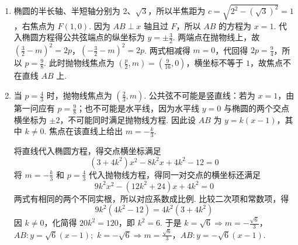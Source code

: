 \begin{solution}
\begin{enumerate}
\item 椭圆的半长轴、半短轴分别为 \(2\)、\(\sqrt3\)，所以半焦距为 \(c=\sqrt{2^2-(\sqrt3)^2}=1\)，右焦点为 \(F(1,0)\). 因为 \(AB\perp x\) 轴且过 \(F\)，所以 \(AB\) 的方程为 \(x=1\). 代入椭圆方程得公共弦端点的纵坐标为 \(y=\pm\frac32\). 两端点在抛物线上，故
\(\left(\frac32-m\right)^2=2p\)，\(\left(-\frac32-m\right)^2=2p\).
两式相减得 \(m=0\)，代回得 \(2p=\frac94\)，所以 \(p=\frac98\). 此时抛物线焦点为 \(\left(\frac{p}{2},m\right)=\left(\frac9{16},0\right)\)，横坐标不等于 \(1\)，故焦点不在直线 \(AB\) 上.
\item 当 \(p=\frac43\) 时，抛物线焦点为 \(\left(\frac23,m\right)\). 公共弦不可能是竖直线：若为 \(x=1\)，由第一问应有 \(p=\frac98\)；也不可能是水平线，因为水平线 \(y=0\) 与椭圆的两个交点横坐标为 \(\pm2\)，不可能同时满足抛物线方程. 因此设 \(AB\) 为 \(y=k(x-1)\)，其中 \(k\neq0\). 焦点在该直线上给出 \(m=-\frac{k}{3}\).

将直线代入椭圆方程，得交点横坐标满足
\[
(3+4k^2)x^2-8k^2x+4k^2-12=0
\]
将 \(m=-\frac{k}{3}\) 和 \(p=\frac43\) 代入抛物线方程，得同一对交点的横坐标还满足
\[
9k^2x^2-(12k^2+24)x+4k^2=0
\]
两式有相同的两个不同实根，所以对应系数成比例. 比较二次项和常数项，得
\[
9k^2(4k^2-12)=4k^2(3+4k^2)
\]
因 \(k\neq0\)，化简得 \(20k^2=120\)，即 \(k^2=6\). 于是
\(k=\sqrt6\Rightarrow m=-\frac{\sqrt6}{3}\)，\(AB:y=\sqrt6(x-1);\)
\(k=-\sqrt6\Rightarrow m=\frac{\sqrt6}{3}\)，\(AB:y=-\sqrt6(x-1)\).
\end{enumerate}
\end{solution}
